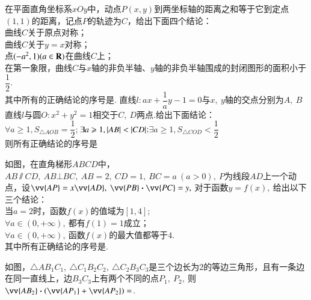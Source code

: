 \documentclass{BHCexam}
\begin{document}
\begin{questions}
\qs 在平面直角坐标系$xOy$中，动点$ P(x,y) $到两坐标轴的距离之和等于它到定点$ (1,1) $的距离，记点$ P $的轨迹为$ C $，给出下面四个结论：\\
 曲线$ C $关于原点对称；\\
 曲线$ C $关于$ y=x $对称；\\
 点$ (-a^2,1)(a\in\mathbf{R}) $在曲线$ C $上；\\
 在第一象限，曲线$ C $与$x$轴的非负半轴、$y$轴的非负半轴围成的封闭图形的面积小于$ \dfrac{1}{2}. $\\
其中所有的正确结论的序号是\tk.
\qs 直线$ l:ax+\dfrac{1}{a}y-1=0 $与$x,~y$轴的交点分别为$ A,~B $直线$ l $与圆$ O:x^2+y^2=1 $相交于$ C,~D $两点.给出下面结论：\\
 $\forall a\ge 1,S_{\triangle AOB}=\dfrac{1}{2};$\quad {}$ \exists a\geqslant 1,\left| AB \right|<\left| CD \right| $;\quad {}$\exists a\ge 1,S_{\triangle COD}<\dfrac{1}{2}$\\
则所有正确结论的序号是\tk\\

\qs 如图，在直角梯形$ ABCD $中，$ AB\sslash CD,~AB\bot BC,~AB=2,~CD=1,~BC=a~(a>0),~ P$为线段$ AD $上一个动点，设$ \vv{AP}=x\vv{AD},~ \vv{PB}\bm{\cdot}\vv{PC}=y,~$对于函数$y=f(x),~$给出以下三个结论：\\
 当$ a=2 $时，函数$f(x)$的值域为$ \left[1,4\right] $;\\
 $ \forall a\in\left(0,+\infty\right),~$都有$ f(1)=1 $成立；\\
 $ \forall a\in\left(0,+\infty\right),~$函数$f(x)$的最大值都等于$ 4 $.\\
其中所有正确结论的序号是\tk.
\vspace{-7em}
\begin{flushright}
\end{flushright}
\qs 如图，$ \triangle AB_1C_1,~\triangle C_1B_2C_2,~\triangle C_2B_3C_3 $是三个边长为2的等边三角形，且有一条边在同一直线上，边$ B_3C_3 $上有两个不同的点$ P_1,~P_2,~ $则$ \vv{AB_2}\bm{\cdot}(\vv{AP_1}+\vv{AP_2}) =$\tk.


\end{questions}
\end{document}
